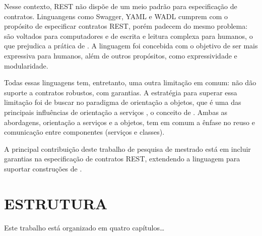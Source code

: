 Nesse contexto, REST não dispõe de um meio padrão para especificação de
contratos. Linguangens como Swagger, YAML e WADL cumprem com o propósito de
especificar contratos REST, porém padecem do mesmo problema: são voltados para
computadores e de escrita e leitura complexa para humanos, o que
prejudica a prática de \CtFirst{}. A linguagem \neoidl{} foi concebida com o objetivo de ser mais
expressiva para humanos, além de outros propósitos, como expressividade e
modularidade.

Todas essas linguagens tem, entretanto, uma outra limitação em comum: não dão
suporte a contratos robustos, com garantias. A estratégia para superar essa
limitação foi de buscar no paradigma de orientação a objetos, que é uma das
principais influências de orientação a serviços \cite{erl2009web},
o conceito de \designbycontract{}. Ambas as abordagens, orientação a serviços e
a objetos, tem em comum a ênfase no reuso e comunicação entre componentes
(serviços e classes).

A principal contribuição deste trabalho de
pesquisa de mestrado está em incluir garantias na especificação de
contratos REST, extendendo a linguagem \neoidl{} para suportar construções de
\designbycontract{}.



\section{ESTRUTURA}
\vspace{-6mm}

Este trabalho está organizado em quatro capítulos\ldots


